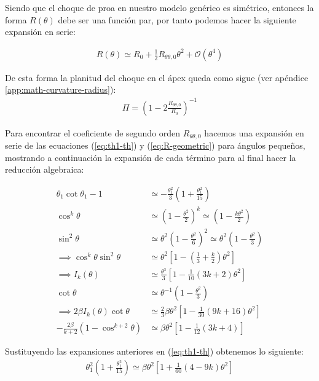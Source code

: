 Siendo que el choque de proa en nuestro modelo genérico es simétrico, entonces la forma $R(\theta)$ debe ser una función par,
por tanto podemos hacer la siguiente expansión en serie:

\begin{align}
  R(\theta) \simeq R_0 + \frac{1}{2}R_{\theta\theta, 0}\theta^2 + \mathcal{O}(\theta^4)
\end{align}

De esta forma la planitud del choque en el ápex queda como sigue (ver apéndice \ref{app:math-curvature-radius}):
\begin{align}
  \Pi = \left(1 - 2\frac{R_{\theta \theta, 0}}{R_0}\right)^{-1}
\end{align}

Para encontrar el coeficiente de segundo orden $R_{\theta \theta, 0}$ hacemos una expansión en serie de las ecuaciones (\ref{eq:th1-th}) y
(\ref{eq:R-geometric}) para ángulos pequeños, mostrando a continuación la expansión de cada término para al final hacer la
reducción algebraica:

\begin{align}
  \theta_1\cot\theta_1 -1 &\simeq -\frac{\theta^2_1}{3}\left(1 + \frac{\theta^2_1}{15}\right) \\
  \cos^k\theta &\simeq \left(1 - \frac{\theta^2}{2}\right)^k \simeq \left(1 - \frac{k\theta^2}{2}\right) \\
  \sin^2\theta &\simeq \theta^2\left(1 - \frac{\theta^2}{6}\right)^2 \simeq \theta^2\left(1 - \frac{\theta^2}{3}\right)\\
  \implies \cos^k\theta\sin^2\theta &\simeq \theta^2\left[1 - \left(\frac{1}{3} + \frac{k}{2}\right)\theta^2\right] \\
  \implies I_k(\theta) &\simeq \frac{\theta^3}{3}\left[1 - \frac{1}{10}\left(3k + 2\right)\theta^2\right] \\
  \cot\theta &\simeq \theta^{-1}\left(1 - \frac{\theta^2}{3}\right) \\
  \implies 2\beta I_k(\theta)\cot\theta &\simeq \frac{2}{3}\beta\theta^2\left[1 - \frac{1}{30}\left(9k + 16\right)\theta^2\right] \\
  -\frac{2\beta}{k+2}\left(1 - \cos^{k+2}\theta\right) &\simeq \beta\theta^2\left[1 - \frac{1}{12}\left(3k+4\right)\right]
\end{align}

Sustituyendo las expansiones anteriores en (\ref{eq:th1-th}) obtenemos lo siguiente:
\begin{align}
  \theta^2_1\left(1 + \frac{\theta^2_1}{15}\right) \simeq \beta\theta^2\left[1 + \frac{1}{60}\left(4 - 9k\right)\theta^2\right]
  \label{eq:th1-th-approx}
\end{align}

